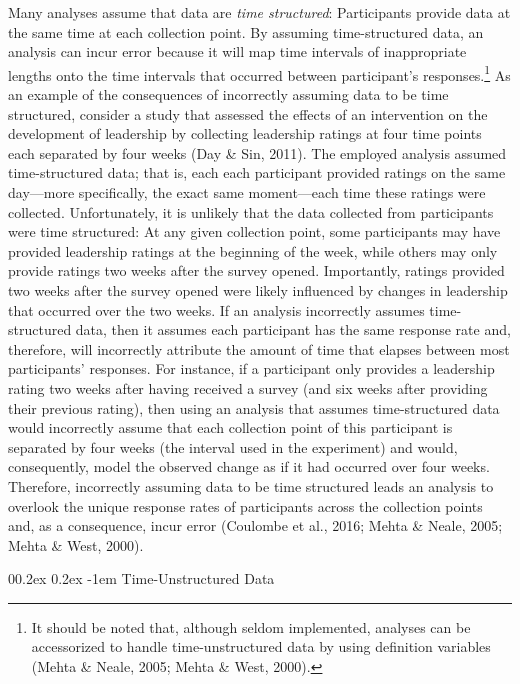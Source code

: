 \documentclass[
  english,
  man,floatsintext]{apa7}
\makeatletter
\let\oldparagraph\paragraph
\renewcommand{\paragraph}[1]{\oldparagraph{#1}\mbox{}}
\renewcommand{\paragraph}{\@startsection{paragraph}{4}{\parindent}%
  {0\baselineskip \@plus 0.2ex \@minus 0.2ex}%
  {-1em}%
  {\normalfont\normalsize\bfseries\itshape\typesectitle}}
\renewcommand{\paragraph}{\@startsection{paragraph}{4}{\parindent}%
  {0\baselineskip \@plus 0.2ex \@minus 0.2ex}%
  {-1em}%
  {\normalfont\normalsize\bfseries\typesectitle}}
\makeatother
\begin{document}
Many analyses assume that data are \emph{time structured}: Participants provide data at the same time at each collection point. By assuming time-structured data, an analysis can incur error because it will map time intervals of inappropriate lengths onto the time intervals that occurred between participant's responses.\footnote{It should be noted that, although seldom implemented, analyses can be accessorized to handle time-unstructured data by using definition variables (Mehta \& Neale, 2005; Mehta \& West, 2000).} As an example of the consequences of incorrectly assuming data to be time structured, consider a study that assessed the effects of an intervention on the development of leadership by collecting leadership ratings at four time points each separated by four weeks (Day \& Sin, 2011). The employed analysis assumed time-structured data; that is, each each participant provided ratings on the same day---more specifically, the exact same moment---each time these ratings were collected. Unfortunately, it is unlikely that the data collected from participants were time structured: At any given collection point, some participants may have provided leadership ratings at the beginning of the week, while others may only provide ratings two weeks after the survey opened. Importantly, ratings provided two weeks after the survey opened were likely influenced by changes in leadership that occurred over the two weeks. If an analysis incorrectly assumes time-structured data, then it assumes each participant has the same response rate and, therefore, will incorrectly attribute the amount of time that elapses between most participants' responses. For instance, if a participant only provides a leadership rating two weeks after having received a survey (and six weeks after providing their previous rating), then using an analysis that assumes time-structured data would incorrectly assume that each collection point of this participant is separated by four weeks (the interval used in the experiment) and would, consequently, model the observed change as if it had occurred over four weeks. Therefore, incorrectly assuming data to be time structured leads an analysis to overlook the unique response rates of participants across the collection points and, as a consequence, incur error (Coulombe et al., 2016; Mehta \& Neale, 2005; Mehta \& West, 2000).

\hypertarget{time-unstructured-data}{%
\paragraph{Time-Unstructured Data}\label{time-unstructured-data}}
\end{document}

